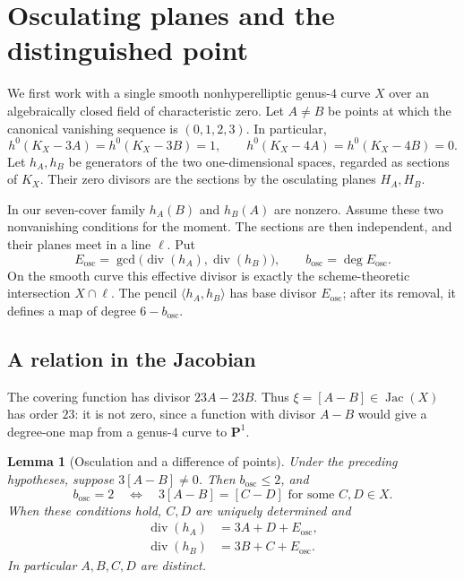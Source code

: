 \documentclass[11pt]{amsart}
\newtheorem{lemma}[lemma]{Lemma}
\theoremstyle{definition}
\theoremstyle{remark}
\newcommand{\PP}{\mathbf P}
\begin{document}
\section{Osculating planes and the distinguished point}
\label{sec:osculating}
\label{sec:mechanism}

We first work with a single smooth nonhyperelliptic genus-$4$ curve $X$
over an algebraically closed field of characteristic zero.
Let $A\ne B$ be points at which the canonical vanishing sequence is
$(0,1,2,3)$.  In particular,
\[
 h^0(K_X-3A)=h^0(K_X-3B)=1,\qquad
 h^0(K_X-4A)=h^0(K_X-4B)=0.
\]
Let $h_A,h_B$ be generators of the two one-dimensional spaces, regarded
as sections of $K_X$.  Their zero divisors are the sections by the
osculating planes $H_A,H_B$.

In our seven-cover family $h_A(B)$ and $h_B(A)$ are nonzero.
Assume these two nonvanishing conditions for the moment.
The sections are then independent, and their planes meet in a line
$\ell$.  Put
\[
 E_{\mathrm{osc}}=
 \gcd\bigl(\operatorname{div}(h_A),\operatorname{div}(h_B)\bigr),
 \qquad b_{\mathrm{osc}}=\deg E_{\mathrm{osc}}.
\]
On the smooth curve this effective divisor is exactly the
scheme-theoretic intersection $X\cap\ell$.
The pencil $\langle h_A,h_B\rangle$ has base divisor $E_{\mathrm{osc}}$;
after its removal, it defines a map of degree $6-b_{\mathrm{osc}}$.

\subsection{A relation in the Jacobian}

The covering function has divisor $23A-23B$.
Thus $\xi=[A-B]\in\operatorname{Jac}(X)$ has order $23$:
it is not zero, since a function with divisor $A-B$ would give a
degree-one map from a genus-$4$ curve to $\PP^1$.

\begin{lemma}[Osculation and a difference of points]
\label{lem:osculating-difference}
Under the preceding hypotheses, suppose $3[A-B]\ne0$.
Then $b_{\mathrm{osc}}\leq2$, and
\[
 b_{\mathrm{osc}}=2
 \quad\Longleftrightarrow\quad
 3[A-B]=[C-D]\text{ for some }C,D\in X.
\]
When these conditions hold, $C,D$ are uniquely determined and
\[
 \begin{aligned}
 \operatorname{div}(h_A)&=3A+D+E_{\mathrm{osc}},\\
 \operatorname{div}(h_B)&=3B+C+E_{\mathrm{osc}}.
 \end{aligned}
\]
In particular $A,B,C,D$ are distinct.
\end{lemma}
\end{document}
